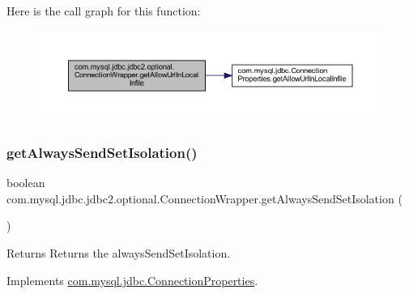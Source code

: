 Here is the call graph for this function\+:
\nopagebreak
\begin{figure}[H]
\begin{center}
\leavevmode
\includegraphics[width=350pt]{classcom_1_1mysql_1_1jdbc_1_1jdbc2_1_1optional_1_1_connection_wrapper_a16443b33fa3689cee078616f0a58f29a_cgraph}
\end{center}
\end{figure}
\mbox{\label{classcom_1_1mysql_1_1jdbc_1_1jdbc2_1_1optional_1_1_connection_wrapper_af45029b8d8ad9603e6d77537609fc193}} 
\subsubsection{\texorpdfstring{get\+Always\+Send\+Set\+Isolation()}{getAlwaysSendSetIsolation()}}
{\footnotesize\ttfamily boolean com.\+mysql.\+jdbc.\+jdbc2.\+optional.\+Connection\+Wrapper.\+get\+Always\+Send\+Set\+Isolation (\begin{DoxyParamCaption}{ }\end{DoxyParamCaption})}

\begin{DoxyReturn}{Returns}
Returns the always\+Send\+Set\+Isolation. 
\end{DoxyReturn}


Implements \mbox{\hyperlink{interfacecom_1_1mysql_1_1jdbc_1_1_connection_properties_a157a33612cbef9f88801ad8f2a4209b4}{com.\+mysql.\+jdbc.\+Connection\+Properties}}.

